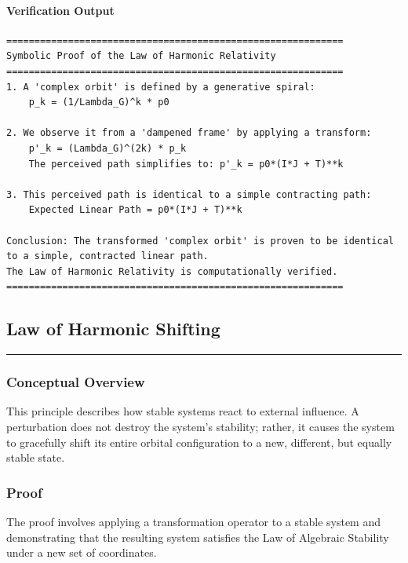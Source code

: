 \paragraph{Verification Output}
\begin{verbatim}
============================================================
Symbolic Proof of the Law of Harmonic Relativity
============================================================
1. A 'complex orbit' is defined by a generative spiral:
    p_k = (1/Lambda_G)^k * p0

2. We observe it from a 'dampened frame' by applying a transform:
    p'_k = (Lambda_G)^(2k) * p_k
    The perceived path simplifies to: p'_k = p0*(I*J + T)**k

3. This perceived path is identical to a simple contracting path:
    Expected Linear Path = p0*(I*J + T)**k

Conclusion: The transformed 'complex orbit' is proven to be identical
to a simple, contracted linear path.
The Law of Harmonic Relativity is computationally verified.
============================================================
\end{verbatim}


\subsection*{Law of Harmonic Shifting}
\hrule
\vspace{0.3cm}
\vspace{0.5cm}

\subsubsection*{Conceptual Overview}
This principle describes how stable systems react to external influence.  A perturbation does not destroy the system's stability; rather, it causes the system to gracefully shift its entire orbital configuration to a new, different, but equally stable state. 

\subsubsection*{Proof}
The proof involves applying a transformation operator to a stable system and demonstrating that the resulting system satisfies the Law of Algebraic Stability under a new set of coordinates. 

